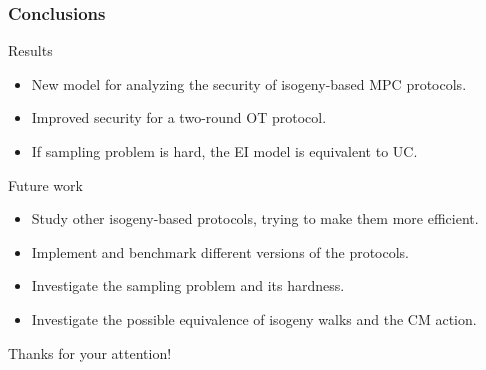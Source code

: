 \documentclass{beamer}
\begin{document}
    \begin{frame}
        \frametitle{Conclusions}
        
        \begin{block}{Results}
            \begin{itemize}
                \item New model for analyzing the security of isogeny-based MPC protocols.
                \item Improved security for a two-round OT protocol.
                \item If sampling problem is hard, the EI model is equivalent to UC.
            \end{itemize}
        \end{block}
    
        \begin{block}{Future work}
            \begin{itemize}
                \item Study other isogeny-based protocols, trying to make them more efficient.
                \item Implement and benchmark different versions of the protocols.
                \item Investigate the sampling problem and its hardness.
                \item Investigate the possible equivalence of isogeny walks and the CM action.
            \end{itemize}
        \end{block}
    \end{frame}

    \begin{frame}
    \begin{center}
        \huge Thanks for your attention!
    \end{center}
    \end{frame}
\end{document}
